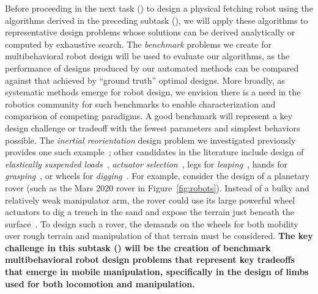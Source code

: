 \documentclass[11pt]{article}
\begin{document}
Before proceeding in the next task () to design a physical fetching robot using the algorithms derived in the preceding subtask (), we will apply these algorithms to representative design problems whose solutions can be derived analytically or computed by exhaustive search.
The \emph{benchmark} problems we create for multibehavioral robot design will be used to evaluate our algorithms, as the performance of designs produced by our automated methods can be compared against that achieved by ``ground truth'' optimal designs.
More broadly, as systematic methods emerge for robot design, we envision there is a need in the robotics community for such benchmarks to enable characterization and comparison of competing paradigms.
A good benchmark will represent a key design challenge or tradeoff with the fewest parameters and simplest behaviors possible.
The \emph{inertial reorientation} design problem we investigated previously provides one such example~\cite{paper:libby_tail_2016}; other candidates in the literature include
design of
\emph{elastically suspended loads}~\cite{Ackerman2013-yk},
\emph{actuator selection}~\cite{Kenneally2016-ml, De2011-cu},
legs for
\emph{leaping}~\cite{Kenneally2015-yj},
hands for 
\emph{grasping}~\cite{Rodriguez2013-hc}, or wheels for \emph{digging}~\cite{paper:pavlov-soil-2019}.
For example, consider the design of a planetary rover (such as the Mars 2020 rover in Figure~\ref{fig:robots}). Instead of a bulky and relatively weak manipulator arm, the rover could use its large powerful wheel actuators to dig a trench in the sand and expose the terrain just beneath the surface~\cite{paper:pavlov-soil-2019}. To design such a rover, the demands on the wheels for both mobility over rough terrain and manipulation of that terrain must be considered.
{\bf The key challenge in this subtask () will be the creation of benchmark multibehavioral robot design problems that represent key tradeoffs that emerge in mobile manipulation, specifically in the design of limbs used for both locomotion and manipulation.}
\end{document}
